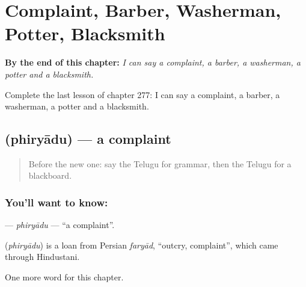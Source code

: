 
\chapter{Complaint, Barber, Washerman, Potter, Blacksmith}
\label{ch:te-complaint-barber-washerman-potter-blacksmith}

\begin{chapteropening}
\textbf{By the end of this chapter:} \emph{I can say a complaint, a barber, a washerman, a potter and a blacksmith.}

Complete the last lesson of chapter 277: I can say a complaint, a barber, a washerman, a potter and a blacksmith.
\end{chapteropening}

\section[\texorpdfstring{\te{ఫిర్యాదు} (phiryādu)}{ఫిర్యాదు (phiryādu)}]{ (phiryādu) — a complaint}

\label{lesson:TE-C277-phiryadu}



\begin{quote}
Before the new one: say the Telugu for grammar, then the Telugu for a blackboard.
\end{quote}

\subsection*{You'll want to know: }
\textbf{} — \emph{phiryādu} — \textquotedblleft{}a complaint\textquotedblright{}.

\begin{cousinweb}
\textbf{} (\emph{phiryādu}) is a loan from Persian \emph{faryād}, \textquotedblleft{}outcry, complaint\textquotedblright{}, which came through Hindustani.
\end{cousinweb}

\begin{grammarlens}[title={What you've built}]
One more word for this chapter.
\end{grammarlens}

